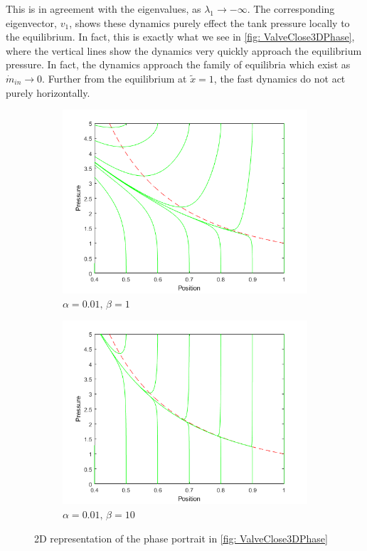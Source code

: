 This is in agreement with the eigenvalues, as $\lambda_1 \rightarrow - \infty$. The corresponding eigenvector, $v_1$, shows these dynamics purely effect the tank pressure locally to the equilibrium. In fact, this is exactly what we see in \cref{fig: ValveClose3DPhase}, where the vertical lines show the dynamics very quickly approach the equilibrium pressure. In fact, the dynamics approach the family of equilibria which exist as $\dot{m}_{in} \rightarrow 0$. Further from the equilibrium at $\tilde{x} = 1$, the fast dynamics do not act purely horizontally.
~
% 
\begin{figure}[ht]
    \centering
    \begin{subfigure}{0.49\textwidth}
    \includegraphics[width=\textwidth]{Figures/LowFlow/PhasePortrait-b=1.png}
    \caption{$\alpha = 0.01, \, \beta = 1$}
    \label{fig: ValveClosePhase1}
    \end{subfigure}
    \begin{subfigure}{0.49\textwidth}
    \includegraphics[width=\textwidth]{Figures/LowFlow/PhasePortrait-b=10.png}
    \caption{$\alpha = 0.01, \, \beta = 10$}
    \label{fig: ValveClosePhase10}
    \end{subfigure}
    \caption{2D representation of the phase portrait in \cref{fig: ValveClose3DPhase}}    \label{fig: ValveClosePhase}
\end{figure}

